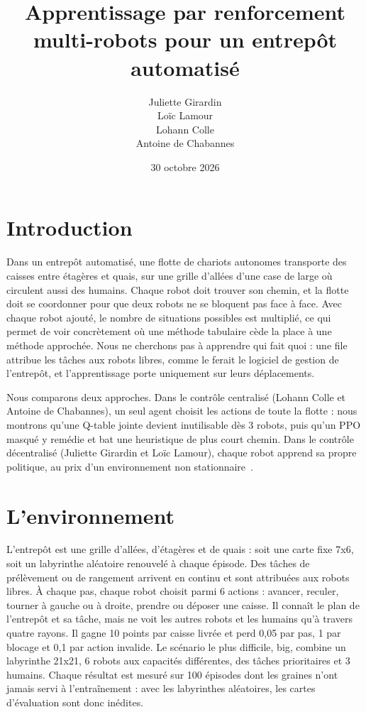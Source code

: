 \documentclass[11pt,a4paper]{article}
\title{Apprentissage par renforcement \\ multi-robots pour un entrepôt automatisé}
\author{
Juliette Girardin\\
Loïc Lamour\\ 
Lohann Colle\\
Antoine de Chabannes}
\date{30 octobre 2026}
\begin{document}
\maketitle

\section{Introduction}

Dans un entrepôt automatisé, une flotte de chariots autonomes transporte des caisses entre étagères et quais, sur une grille d'allées d'une case de large où circulent aussi des humains. Chaque robot doit trouver son chemin, et la flotte doit se coordonner pour que deux robots ne se bloquent pas face à face. Avec chaque robot ajouté, le nombre de situations possibles est multiplié, ce qui permet de voir concrètement où une méthode tabulaire cède la place à une méthode approchée. Nous ne cherchons pas à apprendre qui fait quoi : une file attribue les tâches aux robots libres, comme le ferait le logiciel de gestion de l'entrepôt, et l'apprentissage porte uniquement sur leurs déplacements.

Nous comparons deux approches. Dans le contrôle centralisé (Lohann Colle et Antoine de Chabannes), un seul agent choisit les actions de toute la flotte : nous montrons qu'une Q-table jointe devient inutilisable dès 3 robots, puis qu'un PPO masqué y remédie et bat une heuristique de plus court chemin. Dans le contrôle décentralisé (Juliette Girardin et Loïc Lamour), chaque robot apprend sa propre politique, au prix d'un environnement non stationnaire~\cite{tan1993}.


\section{L'environnement}

L'entrepôt est une grille d'allées, d'étagères et de quais : soit une carte fixe 7x6, soit un labyrinthe aléatoire renouvelé à chaque épisode. Des tâches de prélèvement ou de rangement arrivent en continu et sont attribuées aux robots libres. À chaque pas, chaque robot choisit parmi 6 actions : avancer, reculer, tourner à gauche ou à droite, prendre ou déposer une caisse. Il connaît le plan de l'entrepôt et sa tâche, mais ne voit les autres robots et les humains qu'à travers quatre rayons. Il gagne 10 points par caisse livrée et perd 0,05 par pas, 1 par blocage et 0,1 par action invalide. Le scénario le plus difficile, big, combine un labyrinthe 21x21, 6 robots aux capacités différentes, des tâches prioritaires et 3 humains. Chaque résultat est mesuré sur 100 épisodes dont les graines n'ont jamais servi à l'entraînement : avec les labyrinthes aléatoires, les cartes d'évaluation sont donc inédites.
\end{document}
